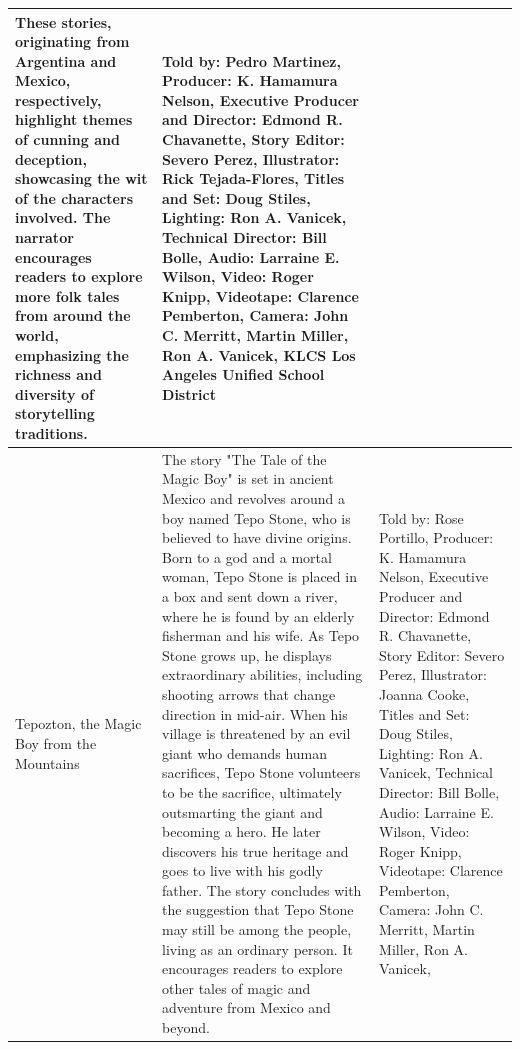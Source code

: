 \begin{table}[h]
\begin{small}
\begin{tabular}{|p{1.5cm}|p{8.5cm}|p{7cm}|}
            These stories, originating from Argentina and Mexico, respectively, highlight themes of cunning and deception, showcasing the wit of the characters involved.
            The narrator encourages readers to explore more folk tales from around the world, emphasizing the richness and diversity of storytelling traditions.
                                 &
            Told by: Pedro Martinez,
            Producer: K. Hamamura Nelson,
            Executive Producer and Director: Edmond R. Chavanette,
            Story Editor: Severo Perez,
            Illustrator: Rick Tejada-Flores,
            Titles and Set: Doug Stiles,
            Lighting: Ron A. Vanicek,
            Technical Director: Bill Bolle,
            Audio: Larraine E. Wilson,
            Video: Roger Knipp,
            Videotape: Clarence Pemberton,
            Camera: John C. Merritt, Martin Miller, Ron A. Vanicek,
            KLCS Los Angeles Unified School District
            \\
            \hline
            Tepozton, the Magic Boy from the Mountains
                                 &
            The story "The Tale of the Magic Boy" is set in ancient Mexico and revolves around a boy named Tepo Stone, who is believed to have divine origins.
            Born to a god and a mortal woman, Tepo Stone is placed in a box and sent down a river, where he is found by an elderly fisherman and his wife.
            As Tepo Stone grows up, he displays extraordinary abilities, including shooting arrows that change direction in mid-air.
            When his village is threatened by an evil giant who demands human sacrifices, Tepo Stone volunteers to be the sacrifice, ultimately outsmarting the giant and becoming a hero.
            He later discovers his true heritage and goes to live with his godly father.
            The story concludes with the suggestion that Tepo Stone may still be among the people, living as an ordinary person.
            It encourages readers to explore other tales of magic and adventure from Mexico and beyond.
                                 &
            Told by: Rose Portillo,
            Producer: K. Hamamura Nelson,
            Executive Producer and Director: Edmond R. Chavanette,
            Story Editor: Severo Perez,
            Illustrator: Joanna Cooke,
            Titles and Set: Doug Stiles,
            Lighting: Ron A. Vanicek,
            Technical Director: Bill Bolle,
            Audio: Larraine E. Wilson,
            Video: Roger Knipp,
            Videotape: Clarence Pemberton,
            Camera: John C. Merritt, Martin Miller, Ron A. Vanicek,

\end{tabular}
\end{small}
\end{table}

